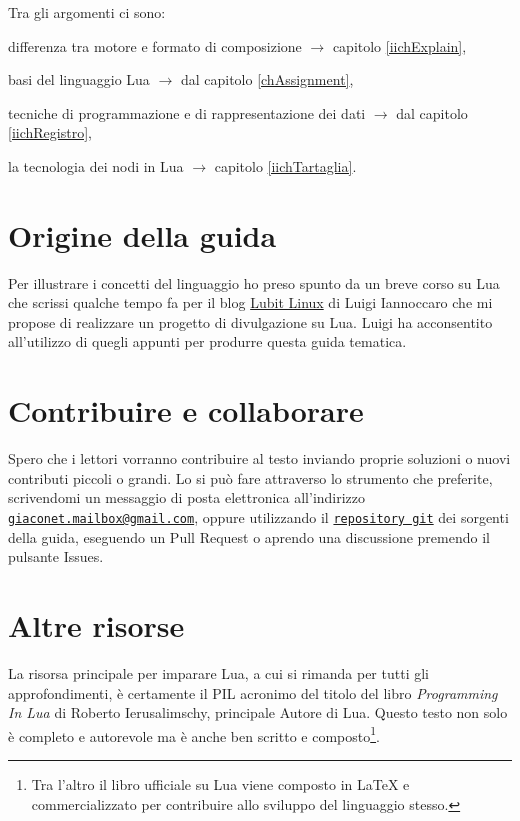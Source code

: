 Tra gli argomenti ci sono:
\begin{compactitemize}
\item differenza tra motore e formato di composizione \( \to \) capitolo
\ref{iichExplain},
\item basi del linguaggio Lua \( \to \) dal capitolo \ref{chAssignment},
\item tecniche di programmazione e di rappresentazione dei dati \( \to \) dal
capitolo \ref{iichRegistro},
\item la tecnologia dei nodi in Lua \( \to \) capitolo \ref{iichTartaglia}.
\end{compactitemize}


\section{Origine della guida}

Per illustrare i concetti del linguaggio ho preso spunto da un breve corso su
Lua che scrissi qualche tempo fa per il blog
\href{http://parliamodi-ubuntu.blogspot.it}{Lubit Linux} di Luigi Iannoccaro
che mi propose di realizzare un progetto di divulgazione su Lua. Luigi ha
acconsentito all'utilizzo di quegli appunti per produrre questa guida tematica.


\section{Contribuire e collaborare}

Spero che i lettori vorranno contribuire al testo inviando proprie soluzioni o
nuovi contributi piccoli o grandi. Lo si può fare attraverso lo strumento che
preferite, scrivendomi un messaggio di posta elettronica all'indirizzo
\href{mailto:giaconet.mailbox@gmail.com}{\texttt{giaconet.mailbox@gmail.com}},
oppure utilizzando il
\href{https://github.com/GuITeX/guidalua}{\texttt{repository git}} dei sorgenti
della guida, eseguendo un Pull Request o aprendo una discussione premendo il
pulsante Issues.


\section{Altre risorse}

La risorsa principale per imparare Lua, a cui si rimanda per tutti gli
approfondimenti, è certamente il PIL \cite{PIL} acronimo del titolo del libro
\emph{Programming In Lua} di Roberto Ierusalimschy, principale Autore di Lua.
Questo testo non solo è completo e autorevole ma è anche ben scritto e
composto\footnote{Tra l'altro il libro ufficiale su Lua viene composto in
\LaTeX{} e commercializzato per contribuire allo sviluppo del linguaggio
stesso.}.

